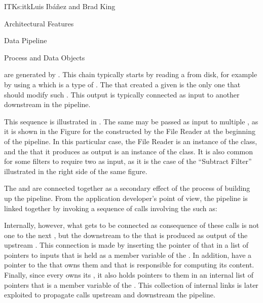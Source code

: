 \begin{aosachapter}{ITK}{s:itk}{Luis Ib\'{a}\~{n}ez and Brad King}
\begin{aosasect1}{Architectural Features}
\begin{aosasect2}{Data Pipeline}
\begin{aosasect3}{Process and Data Objects}

 are generated by . This chain typically starts by
reading a  from disk, for example by using a  which is
a type of . The  that created a given  is
the only one that should modify such . This output  is
typically connected as input to another  downstream in the pipeline.

This sequence is illustrated in .
The same  may be passed as input to multiple
, as it is shown in the Figure for the 
constructed by the File Reader at the beginning of the pipeline.
In this particular case, the File Reader is an instance of the
 class, and the  that it produces as
output is an instance of the  class.
It is also common for some filters to require two  as input,
as it is the case of the ``Subtract Filter'' illustrated in the right side of
the same figure.

The  and  are connected together as a
secondary effect of the process of building up the pipeline. From the
application developer's point of view, the pipeline is linked together by
invoking a sequence of calls involving the  such as:

\begin{aosaitemize}
\item {}
\item {}
\item {}
\end{aosaitemize}

Internally, however, what gets to be connected as consequence of these calls is
not one  to the next , but the
downstream  to the  that is produced as
output of the upstream . This connection is made by
inserting the pointer of that  in a list of pointers to inputs
that is held as a member variable of the . In addition,
 have a pointer to the  that owns them
and that is responsible for computing its content. Finally, since every
 owns its , it also holds pointers to
them in an internal list of pointers that is a member variable of the
. This collection of internal links is later exploited to
propagate calls upstream and downstream the pipeline.


\end{aosasect3}
\end{aosasect2}
\end{aosasect1}
\end{aosachapter}
